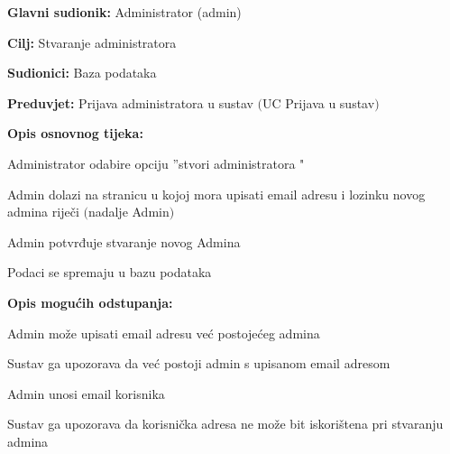 					\noindent {}
					\begin{packed_item}
	
						\item \textbf{Glavni sudionik:} Administrator (admin)
						\item  \textbf{Cilj:} Stvaranje administratora
						\item  \textbf{Sudionici:} Baza podataka
						\item  \textbf{Preduvjet:} Prijava administratora u sustav $($UC Prijava u sustav$)$
						\item  \textbf{Opis osnovnog tijeka:}
						
						\item[] \begin{packed_enum}
	
							\item Administrator odabire opciju ”stvori administratora "
							\item Admin dolazi na stranicu u kojoj mora upisati email adresu i lozinku novog admina riječi $($nadalje Admin$)$
							\item Admin potvrđuje stvaranje novog Admina
							\item Podaci se spremaju u bazu podataka
						\end{packed_enum}
						
						\item  \textbf{Opis mogućih odstupanja:}
						
						\item[] \begin{packed_item}
	
							\item[2.a] Admin može upisati email adresu već postojećeg admina
							\item[] \begin{packed_enum}
								
								\item Sustav ga upozorava da već postoji admin s upisanom email adresom							
							\end{packed_enum}

							\item[2.b] Admin unosi email korisnika
							\item[] \begin{packed_enum}
								
								\item Sustav ga upozorava da korisnička adresa ne može bit iskorištena pri stvaranju admina								
							\end{packed_enum}
							
						\end{packed_item}
					\end{packed_item}


